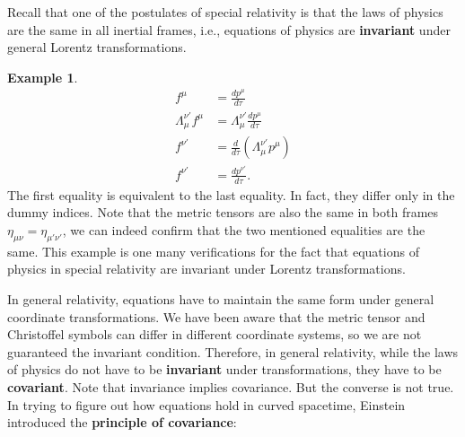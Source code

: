 \documentclass{book}
\theoremstyle{definition}
\newtheorem{exmp}{Example}[section]
\begin{document}
Recall that one of the postulates of special relativity is that the laws of physics are the same in all inertial frames, i.e., equations of physics are \textbf{invariant} under general Lorentz transformations.\\
\begin{exmp}
	\begin{align*}
	f^\mu &= \frac{dp^\mu}{d\tau}\\
	\Lambda^{\nu'}_{\mu}f^\mu &= \Lambda^{\nu'}_\mu\frac{dp^\mu}{d\tau} \\
	f^{\nu'} &= \frac{d}{d\tau}\left(\Lambda^{\nu'}_\mu p^\mu \right) \\
	f^{\nu'} &= \frac{dp^{\nu'}}{d\tau}.
	\end{align*}
	The first equality is equivalent to the last equality. In fact, they differ only in the dummy indices. Note that the metric tensors are also the same in both frames $\eta_{\mu\nu} = \eta_{\mu'\nu'}$, we can indeed confirm that the two mentioned equalities are the same. This example is one many verifications for the fact that equations of physics in special relativity are invariant under Lorentz transformations.\\
\end{exmp}

In general relativity, equations have to maintain the same form under general coordinate transformations. We have been aware that the metric tensor and Christoffel symbols can differ in different coordinate systems, so we are not guaranteed the invariant condition. Therefore, in general relativity, while the laws of physics do not have to be \textbf{invariant} under transformations, they have to be \textbf{covariant}. Note that invariance implies covariance. But the converse is not true.\\

In trying to figure out how equations hold in curved spacetime, Einstein introduced the \textbf{principle of covariance}:\\

\\\\
\end{document}
